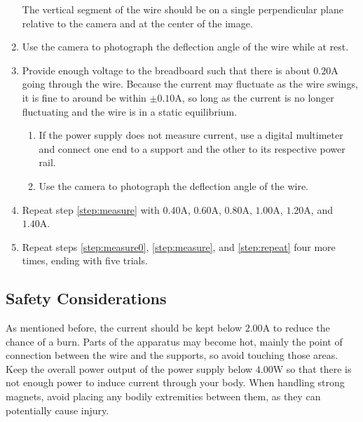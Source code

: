 \begin{enumerate}
	The vertical segment of the wire should be on a single perpendicular plane relative to the camera and at the center of the image.
	\item Use the camera to photograph the deflection angle of the wire while at rest. \label{step:measure0}
	\item Provide enough voltage to the breadboard such that there is about $0.20\si{\ampere}$ going through the wire.
	Because the current may fluctuate as the wire swings, it is fine to around be within $\pm0.10\si{\ampere}$, so long as the current is no longer fluctuating and the wire is in a static equilibrium. \label{step:measure}
	\vspace{-1em} %
	\begin{enumerate}
		\item If the power supply does not measure current, use a digital multimeter and connect one end to a support and the other to its respective power rail.
		\item Use the camera to photograph the deflection angle of the wire. 
	\end{enumerate}
	\item Repeat step \ref{step:measure} with $0.40\si{\ampere}$, $0.60\si{\ampere}$, $0.80\si{\ampere}$, $1.00\si{\ampere}$, $1.20\si{\ampere}$, and $1.40\si{\ampere}$.\label{step:repeat}
	\item Repeat steps \ref{step:measure0}, \ref{step:measure}, and \ref{step:repeat} four more times, ending with five trials.
\end{enumerate}

\subsection*{Safety Considerations}

As mentioned before, the current should be kept below $2.00\si{\ampere}$ to reduce the chance of a burn.
Parts of the apparatus may become hot, mainly the point of connection between the wire and the supports, so avoid touching those areas.
Keep the overall power output of the power supply below $4.00\si{\watt}$ so that there is not enough power to induce current through your body.
When handling strong magnets, avoid placing any bodily extremities between them, as they can potentially cause injury.
